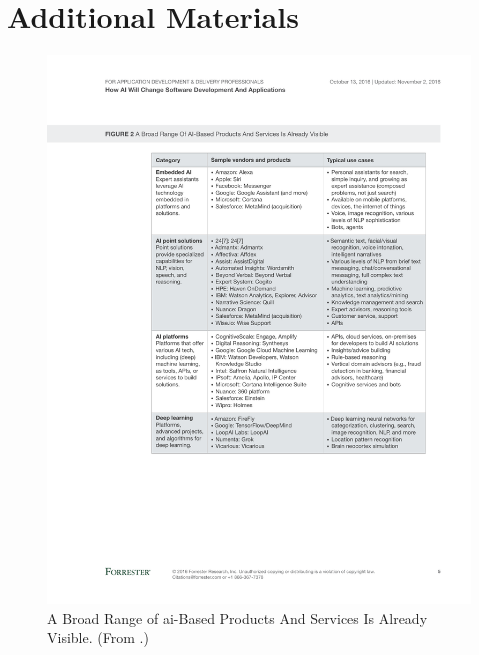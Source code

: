 \chapter{Additional Materials}
\label{ch:additional-materials}

\cleardoublepage



\clearpage

\begin{figure}[p!]
\centering
\caption[Categorisation of AI-based products and services]{A Broad Range of \gls{ai}-Based Products And Services Is Already Visible. (From \citep{LoGiudice:2016wf}.)}
\label{fig:introduction:ai-products}
\includegraphics[width=\linewidth]{mainmatter/introduction/figures/ai-products}
\end{figure}

